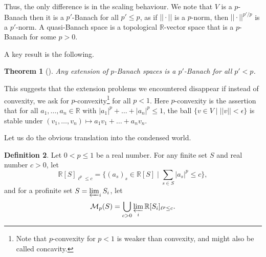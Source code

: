 \documentclass[11pt]{amsbook}
\numberwithin{equation}{section}
\newtheorem{theorem}{Theorem}
\numberwithin{theorem}{section}
\theoremstyle{definition}
\newtheorem{definition}[theorem]{Definition}
\begin{document}
Thus, the only difference is in the scaling behaviour. We note that $V$ is a $p$-Banach then it is a $p'$-Banach for all $p'\leq p$, as if $||\cdot||$ is a $p$-norm, then $||\cdot||^{p'/p}$ is a $p'$-norm. A quasi-Banach space is a topological $\mathbb R$-vector space that is a $p$-Banach for some $p>0$.

A key result is the following.

\begin{theorem}[\cite{KaltonConvexityType}]\label{thm:pBanachExt} Any extension of $p$-Banach spaces is a $p'$-Banach for all $p'<p$.
\end{theorem}

This suggests that the extension problems we encountered disappear if instead of convexity, we ask for $p$-convexity\footnote{Note that $p$-convexity for $p<1$ is weaker than convexity, and might also be called concavity.} for all $p<1$. Here $p$-convexity is the assertion that for all $a_1,\ldots,a_n\in \mathbb R$ with $|a_1|^p+\ldots+|a_n|^p\leq 1$, the ball $\{v\in V\mid ||v||<\epsilon\}$ is stable under $(v_1,\ldots,v_n)\mapsto a_1v_1+\ldots+a_nv_n$.

Let us do the obvious translation into the condensed world.

\begin{definition} Let $0<p\leq 1$ be a real number. For any finite set $S$ and real number $c>0$, let
\[
\mathbb R[S]_{\ell^p\leq c} = \{(a_s)_s\in \mathbb R[S]\mid \sum_{s\in S} |a_s|^p\leq c\},
\]
and for a profinite set $S=\varprojlim_i S_i$, let
\[
\mathcal M_p(S) = \bigcup_{c>0} \varprojlim_i \mathbb R[S_i]_{\ell^p\leq c}.
\]
\end{definition}
\end{document}
